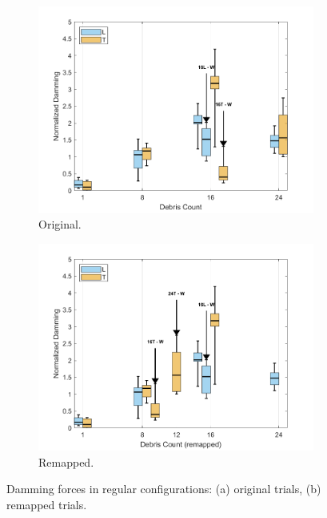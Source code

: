 \documentclass{article}
\begin{document}
\begin{figure}[htbp]
    \centering
    \begin{subfigure}[t]{0.48\textwidth}
        \centering
        \includegraphics[width=\textwidth]{Damming_Regular_SplitByTrial.png}
        \caption{Original.}
        \label{fig:damming_regular_original}
    \end{subfigure}
    \hfill
    \begin{subfigure}[t]{0.48\textwidth}
        \centering
        \includegraphics[width=\textwidth]{Damming_Regular_L_T_SplitByTrial_Remapped.png}
        \caption{Remapped.}
        \label{fig:damming_regular_remap}
    \end{subfigure}
    \caption{Damming forces in regular configurations: (a) original trials, (b) remapped trials.}
    \label{fig:damming_regular_split}
\end{figure}
\end{document}
